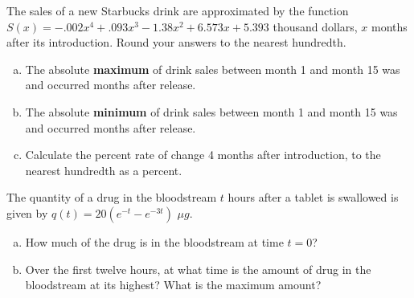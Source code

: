 \documentclass[notes]{subfiles}
\begin{document}
		\begin{ex}
			The sales of a new Starbucks drink are approximated by the function $S(x) =  -.002 x^4 + .093 x^3 - 1.38 x^2 + 6.573 x + 5.393$ thousand dollars, $x$ months after its introduction.  Round your answers to the nearest hundredth.  
			\begin{enumerate}[(a)]
				\item The absolute \textbf{maximum} of drink sales between month 1 and month 15 was \makebox[1.5in]{\hrulefill} \\[20pt]
	and occurred \makebox[2in]{\hrulefill} months after release.\\
				\item The absolute \textbf{minimum} of drink sales between month 1 and month 15 was \makebox[1.5in]{\hrulefill} \\[20pt]
	and occurred \makebox[2in]{\hrulefill} months after release. \\
				\item Calculate the percent rate of change 4 months after introduction, to the nearest hundredth as a percent.  
			\end{enumerate}
		\end{ex}
		
		\begin{ex}
			The quantity of a drug in the bloodstream $t$ hours after a tablet is swallowed is given by $q(t) = 20(e^{-t}-e^{-3t})$ $\mu g$.  
			\begin{enumerate}[(a)]
				\item How much of the drug is in the bloodstream at time $t = 0$?
					\vs{1}
				\item Over the first twelve hours, at what time is the amount of drug in the bloodstream at its highest?  What is the maximum amount?
					\vs{2}
			\end{enumerate}
		\end{ex}

	\clearpage
\end{document}
